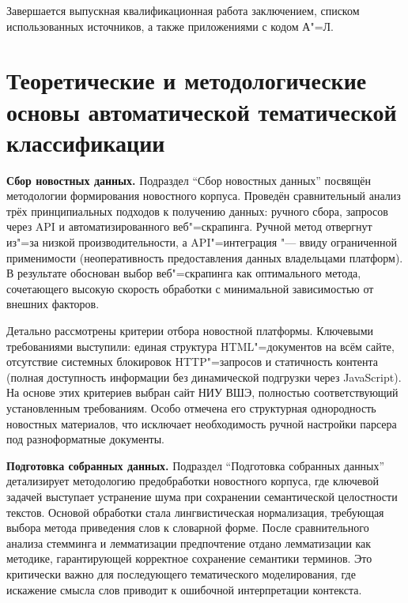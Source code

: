 \documentclass[autoref]{SCWorks}
\begin{document}
Завершается выпускная квалификационная работа заключением, списком
использованных источников, а также приложениями с кодом А"=Л.

\section{Теоретические и методологические основы автоматической тематической
классификации}
\textbf{Сбор новостных данных.}
Подраздел \enquote{Сбор новостных данных} посвящён методологии формирования
новостного корпуса. Проведён сравнительный анализ трёх принципиальных подходов
к получению данных: ручного сбора, запросов через API и автоматизированного
веб"=скрапинга. Ручной метод отвергнут из"=за низкой производительности, а
API"=интеграция "--- ввиду ограниченной применимости (неоперативность
предоставления данных владельцами платформ). В результате обоснован выбор
веб"=скрапинга как оптимального метода, сочетающего высокую скорость обработки
с минимальной зависимостью от внешних факторов.

Детально рассмотрены критерии отбора новостной платформы. Ключевыми требованиями
выступили: единая структура HTML"=документов на всём сайте, отсутствие
системных блокировок HTTP"=запросов и статичность контента (полная доступность
информации без динамической подгрузки через JavaScript). На основе этих
критериев выбран сайт НИУ ВШЭ, полностью соответствующий установленным
требованиям. Особо отмечена его структурная однородность новостных материалов,
что исключает необходимость ручной настройки парсера под разноформатные
документы.

\textbf{Подготовка собранных данных.}
Подраздел \enquote{Подготовка собранных данных} детализирует методологию
предобработки новостного корпуса, где ключевой задачей выступает устранение шума
при сохранении семантической целостности текстов. Основой обработки стала
лингвистическая нормализация, требующая выбора метода приведения слов к
словарной форме. После сравнительного анализа стемминга и лемматизации
предпочтение отдано лемматизации как методике, гарантирующей корректное
сохранение семантики терминов. Это критически важно для последующего
тематического моделирования, где искажение смысла слов приводит к ошибочной
интерпретации контекста.
\end{document}
